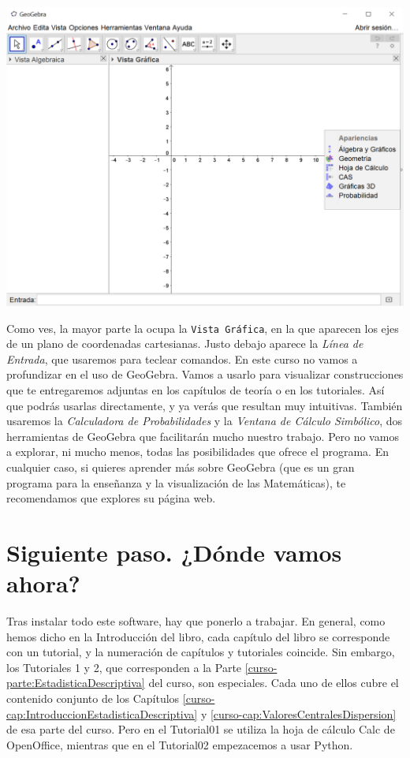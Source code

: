 \documentclass[10pt,a4paper]{article}\usepackage[]{graphicx}\usepackage[]{color}
\newcounter {cont01}
\begin{document}
    \begin{center}
    \includegraphics[width=15cm]{../fig/Tut00-GeoGebraSetup06-201605.png}
    \end{center}
Como ves, la mayor parte la ocupa la {\tt Vista Gráfica}, en la que aparecen los ejes de un plano
de coordenadas cartesianas.  Justo debajo aparece la {\em Línea de Entrada}, que usaremos para teclear comandos. En este curso no vamos a profundizar en el uso de GeoGebra. Vamos a usarlo para visualizar construcciones que te entregaremos adjuntas en los capítulos de
teoría o en los tutoriales. Así que podrás usarlas directamente, y ya verás que resultan muy
intuitivas. También usaremos la {\em Calculadora de Probabilidades} y la {\em Ventana de Cálculo Simbólico}, dos herramientas de GeoGebra que facilitarán mucho nuestro trabajo. Pero no vamos a explorar, ni mucho menos, todas las posibilidades que ofrece el programa. En cualquier caso, si quieres aprender más sobre GeoGebra (que es un gran programa para la enseñanza y la visualización de las Matemáticas), te recomendamos que explores su página web.

\section{Siguiente paso. ¿Dónde vamos ahora?}

Tras instalar todo este software, hay que ponerlo a trabajar. En general, como hemos dicho en la Introducción del libro, cada capítulo del libro se corresponde con un tutorial, y la numeración de capítulos y tutoriales coincide. Sin embargo, los Tutoriales 1 y 2, que corresponden a la Parte \ref{curso-parte:EstadisticaDescriptiva} del curso, son especiales. Cada uno de ellos cubre el contenido conjunto de los Capítulos \ref{curso-cap:IntroduccionEstadisticaDescriptiva} y \ref{curso-cap:ValoresCentralesDispersion} de esa parte del curso. Pero en el Tutorial01 se utiliza la hoja de cálculo Calc de OpenOffice, mientras que en el Tutorial02 empezacemos a usar Python.
\end{document}

